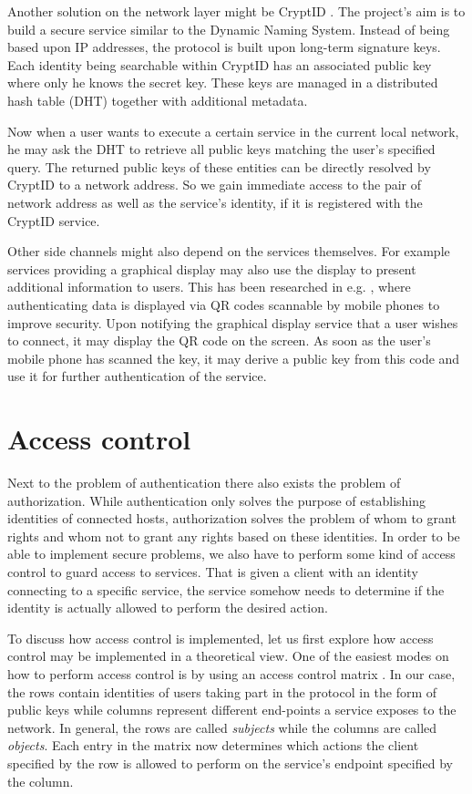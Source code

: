 Another solution on the network layer might be CryptID \cite{malchow2015cryptid}.
The project's aim is to build a secure service similar to the Dynamic Naming System.
Instead of being based upon IP addresses, the protocol is built upon long-term signature keys.
Each identity being searchable within CryptID has an associated public key where only he knows the secret key.
These keys are managed in a distributed hash table (DHT) together with additional metadata.

Now when a user wants to execute a certain service in the current local network, he may ask the DHT to retrieve all public keys matching the user's specified query.
The returned public keys of these entities can be directly resolved by CryptID to a network address.
So we gain immediate access to the pair of network address as well as the service's identity, if it is registered with the CryptID service.

Other side channels might also depend on the services themselves.
For example services providing a graphical display may also use the display to present additional information to users.
This has been researched in e.g. \cite{mccune2005seeing,saxena2006secure}, where authenticating data is displayed via QR codes scannable by mobile phones to improve security.
Upon notifying the graphical display service that a user wishes to connect, it may display the QR code on the screen.
As soon as the user's mobile phone has scanned the key, it may derive a public key from this code and use it for further authentication of the service.

\section{Access control}
\label{sec:access-control}

Next to the problem of authentication there also exists the problem of authorization.
While authentication only solves the purpose of establishing identities of connected hosts, authorization solves the problem of whom to grant rights and whom not to grant any rights based on these identities.
In order to be able to implement secure problems, we also have to perform some kind of access control to guard access to services.
That is given a client with an identity connecting to a specific service, the service somehow needs to determine if the identity is actually allowed to perform the desired action.

To discuss how access control is implemented, let us first explore how access control may be implemented in a theoretical view.
One of the easiest modes on how to perform access control is by using an access control matrix \cite{lampson1974protection,tanenbaum2014modern}.
In our case, the rows contain identities of users taking part in the protocol in the form of public keys while columns represent different end-points a service exposes to the network.
In general, the rows are called \emph{subjects} while the columns are called \emph{objects}.
Each entry in the matrix now determines which actions the client specified by the row is allowed to perform on the service's endpoint specified by the column.

